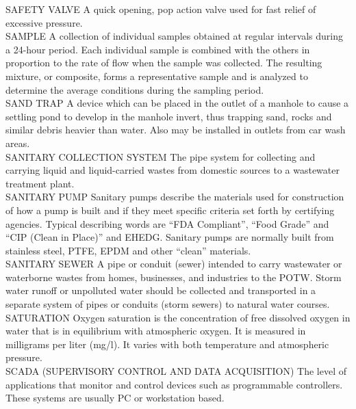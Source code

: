 SAFETY VALVE
A quick opening, pop action valve used for fast relief of excessive pressure.
\vspace{0.3cm}\\
SAMPLE
A collection of individual samples obtained at regular intervals during a 24-hour period. Each individual sample is combined with the others in proportion to the rate of flow when the sample was collected. The resulting mixture, or composite, forms a representative sample and is analyzed to determine the average conditions during the sampling period.
\vspace{0.3cm}\\
SAND TRAP
A device which can be placed in the outlet of a manhole to cause a settling pond to develop in the manhole invert, thus trapping sand, rocks and similar debris heavier than water. Also may be installed in outlets from car wash areas. 
\vspace{0.3cm}\\
SANITARY COLLECTION SYSTEM
The pipe system for collecting and carrying liquid and liquid-carried wastes from domestic sources to a wastewater treatment plant. 
\vspace{0.3cm}\\
SANITARY PUMP
Sanitary pumps describe the materials used for construction of how a pump is built and if they meet specific criteria set forth by certifying agencies. Typical describing words are “FDA Compliant”, “Food Grade” and “CIP (Clean in Place)” and EHEDG. Sanitary pumps are normally built from stainless steel, PTFE, EPDM and other “clean” materials.
\vspace{0.3cm}\\
SANITARY SEWER
A pipe or conduit (sewer) intended to carry wastewater or waterborne wastes from homes, businesses, and industries to the POTW. Storm water runoff or unpolluted water should be collected and transported in a separate system of pipes or conduits (storm sewers) to natural water courses. 
\vspace{0.3cm}\\
SATURATION
Oxygen saturation is the concentration of free dissolved oxygen in water that is in equilibrium with atmospheric oxygen. It is measured in milligrams per liter (mg/l). It varies with both temperature and atmospheric pressure.
\vspace{0.3cm}\\

SCADA (SUPERVISORY CONTROL AND DATA ACQUISITION)
The level of applications that monitor and control devices such as programmable controllers. These systems are usually PC or workstation based.
\vspace{0.3cm}\\

